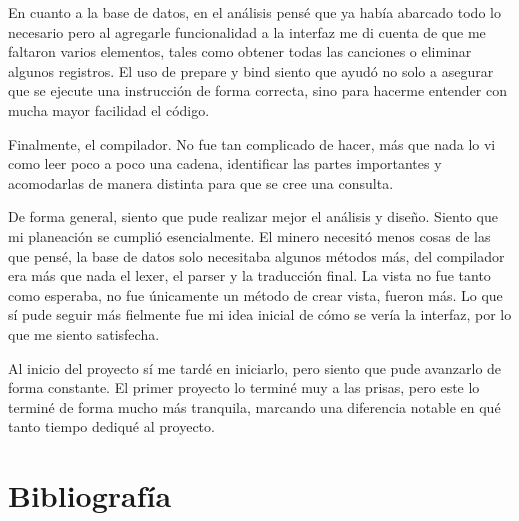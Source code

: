 \documentclass{article}
\begin{document}
En cuanto a la base de datos, en el análisis pensé que ya había abarcado todo lo necesario pero al agregarle funcionalidad a la interfaz me di cuenta de que me faltaron varios elementos, tales como obtener todas las canciones o eliminar algunos registros. El uso de prepare y bind siento que ayudó no solo a asegurar que se ejecute una instrucción de forma correcta, sino para hacerme entender con mucha mayor facilidad el código.

Finalmente, el compilador. No fue tan complicado de hacer, más que nada lo vi como leer poco a poco una cadena, identificar las partes importantes y acomodarlas de manera distinta para que se cree una consulta.

De forma general, siento que pude realizar mejor el análisis y diseño. Siento que mi planeación se cumplió esencialmente. El minero necesitó menos cosas de las que pensé, la base de datos solo necesitaba algunos métodos más, del compilador era más que nada el lexer, el parser y la traducción final. La vista no fue tanto como esperaba, no fue únicamente un método de crear vista, fueron más. Lo que sí pude seguir más fielmente fue mi idea inicial de cómo se vería la interfaz, por lo que me siento satisfecha.

Al inicio del proyecto sí me tardé en iniciarlo, pero siento que pude avanzarlo de forma constante. El primer proyecto lo terminé muy a las prisas, pero este lo terminé de forma mucho más tranquila, marcando una diferencia notable en qué tanto tiempo dediqué al proyecto.

\section{Bibliografía}

\nocite{*}
\printbibliography
\end{document}
